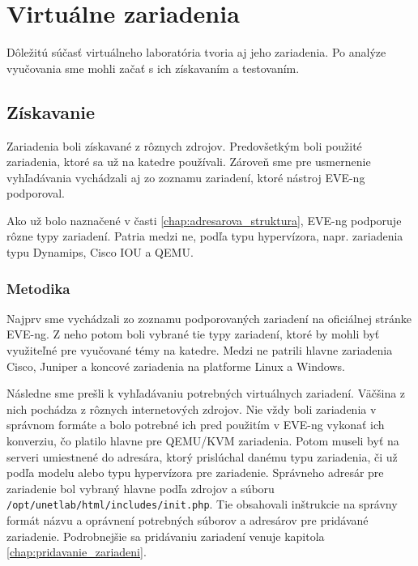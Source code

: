 \chapter{Virtuálne zariadenia}
\label{chap:virt_zariadenia}

Dôležitú súčasť virtuálneho laboratória tvoria aj jeho zariadenia. Po analýze vyučovania sme mohli začať s ich získavaním a testovaním.





\section{Získavanie}

Zariadenia boli získavané z rôznych zdrojov. Predovšetkým boli použité zariadenia, ktoré sa už na katedre používali. Zároveň sme pre usmernenie vyhľadávania vychádzali aj zo zoznamu zariadení, ktoré nástroj EVE-ng podporoval.

Ako už bolo naznačené v časti \ref{chap:adresarova_struktura}, EVE-ng podporuje rôzne typy zariadení. Patria medzi ne, podľa typu hypervízora, napr. zariadenia typu Dynamips, Cisco IOU a QEMU.





\subsection{Metodika}

Najprv sme vychádzali zo zoznamu podporovaných zariadení na oficiálnej stránke EVE-ng. Z neho potom boli vybrané tie typy zariadení, ktoré by mohli byť využiteľné pre vyučované témy na katedre. Medzi ne patrili hlavne zariadenia Cisco, Juniper a koncové zariadenia na platforme Linux a Windows.

Následne sme prešli k vyhľadávaniu potrebných virtuálnych zariadení. Väčšina z nich pochádza z rôznych internetových zdrojov. Nie vždy boli zariadenia v správnom formáte a bolo potrebné ich pred použitím v EVE-ng vykonať ich konverziu, čo platilo hlavne pre QEMU/KVM zariadenia. Potom museli byť na serveri umiestnené do adresára, ktorý prislúchal danému typu zariadenia, či už podľa modelu alebo typu hypervízora pre zariadenie. Správneho adresár pre zariadenie bol vybraný hlavne podľa zdrojov \cite{eve_ng_qemu_namings, dalsie_navody_eve_ng} a súboru \\
\texttt{/opt/unetlab/html/includes/init.php}. Tie obsahovali inštrukcie na správny formát názvu a oprávnení potrebných súborov a adresárov pre pridávané zariadenie. Podrobnejšie sa pridávaniu zariadení venuje kapitola \ref{chap:pridavanie_zariadeni}.

